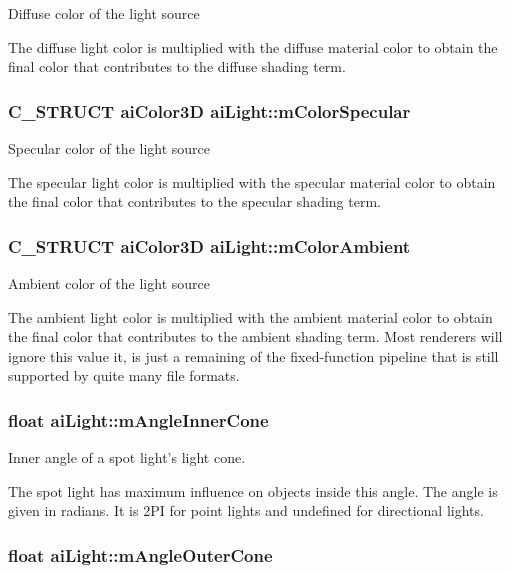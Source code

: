 Diffuse color of the light source

The diffuse light color is multiplied with the diffuse material color to obtain the final color that contributes to the diffuse shading term. \hypertarget{structai_light_a79ae6ad6a10f0cb9c740e23b6bb01bf}{
\subsubsection[mColorSpecular]{\setlength{\rightskip}{0pt plus 5cm}C\_\-STRUCT {\bf aiColor3D} {\bf aiLight::mColorSpecular}}}
\label{structai_light_a79ae6ad6a10f0cb9c740e23b6bb01bf}


Specular color of the light source

The specular light color is multiplied with the specular material color to obtain the final color that contributes to the specular shading term. \hypertarget{structai_light_5188b60e6fbaf1635fa780913508e3cd}{
\subsubsection[mColorAmbient]{\setlength{\rightskip}{0pt plus 5cm}C\_\-STRUCT {\bf aiColor3D} {\bf aiLight::mColorAmbient}}}
\label{structai_light_5188b60e6fbaf1635fa780913508e3cd}


Ambient color of the light source

The ambient light color is multiplied with the ambient material color to obtain the final color that contributes to the ambient shading term. Most renderers will ignore this value it, is just a remaining of the fixed-function pipeline that is still supported by quite many file formats. \hypertarget{structai_light_bad0466811938623e98bf1d334143f9a}{
\subsubsection[mAngleInnerCone]{\setlength{\rightskip}{0pt plus 5cm}float {\bf aiLight::mAngleInnerCone}}}
\label{structai_light_bad0466811938623e98bf1d334143f9a}


Inner angle of a spot light's light cone.

The spot light has maximum influence on objects inside this angle. The angle is given in radians. It is 2PI for point lights and undefined for directional lights. \hypertarget{structai_light_20fd332a5f9d8e8cb94816ff2b0ae7f4}{
\subsubsection[mAngleOuterCone]{\setlength{\rightskip}{0pt plus 5cm}float {\bf aiLight::mAngleOuterCone}}}
\label{structai_light_20fd332a5f9d8e8cb94816ff2b0ae7f4}


